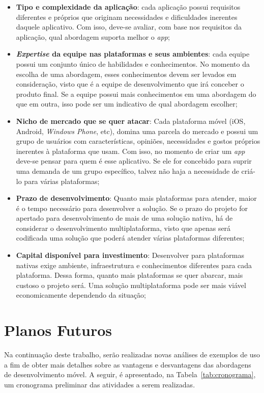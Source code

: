 \begin{itemize}
    \item \textbf{Tipo e complexidade da aplicação}: cada aplicação possui requisitos diferentes e próprios que originam necessidades e dificuldades inerentes daquele aplicativo. Com isso, deve-se avaliar,
    com base nos requisitos da aplicação, qual abordagem suporta melhor o \textit{app};
    \item \textbf{\textit{Expertise} da equipe nas plataformas e seus ambientes}: cada equipe possui um conjunto único de habilidades e conhecimentos. No momento da escolha de uma abordagem, esses conhecimentos
    devem ser levados em consideração, visto que é a equipe de desenvolvimento que irá conceber o produto final. Se a equipe possui mais conhecimentos em uma abordagem do que em outra, isso pode ser 
    um indicativo de qual abordagem escolher;
    \item \textbf{Nicho de mercado que se quer atacar}: Cada plataforma móvel (iOS, Android, \textit{Windows Phone}, etc), domina uma parcela do mercado e possui um grupo de usuários com 
    características, opiniões, necessidades e gostos próprios inerentes à plataforma que usam. Com isso, no momento de criar um \textit{app} deve-se pensar para quem é esse aplicativo. Se ele for concebido 
    para suprir uma demanda de um grupo específico, talvez não haja a necessidade de criá-lo para várias plataformas;
    \item \textbf{Prazo de desenvolvimento}: Quanto mais plataformas para atender, maior é o tempo necessário para desenvolver a solução. Se o prazo do projeto for apertado para desenvolvimento de mais de uma solução 
    nativa, há de considerar o desenvolvimento multiplataforma, visto que apenas será codificada uma solução que poderá atender várias plataformas diferentes;
    \item \textbf{Capital disponível para investimento}: Desenvolver para plataformas nativas exige ambiente, infraestrutura e conhecimentos diferentes para cada plataforma. Dessa forma, quanto mais plataformas se 
    quer abarcar, mais custoso o projeto será. Uma solução multiplataforma pode ser mais viável economicamente dependendo da situação;
\end{itemize}

\section{Planos Futuros} \label{section:planosfuturos}

Na continuação deste trabalho, serão realizadas novas análises de exemplos de uso a fim de obter mais detalhes sobre as vantagens e desvantagens das abordagens de desenvolvimento móvel.
A seguir, é apresentado, na Tabela~\ref{tab:cronograma}, um cronograma preliminar das atividades a serem realizadas.

